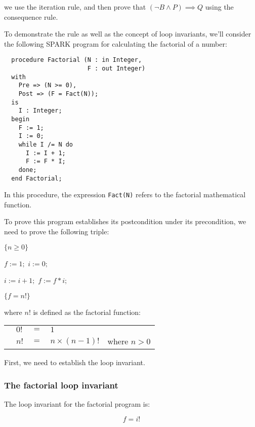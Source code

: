 we use the iteration rule, and then prove that $(\neg B \land P) \implies Q$ using the consequence rule.

\begin{example}
\label{ex:hoare-logic:factorial-proof}

To demonstrate the rule as well as the concept of loop invariants, we'll consider the following SPARK program for calculating the factorial of a number:

\lstset{aboveskip=3mm}
\begin{lstlisting}
  procedure Factorial (N : in Integer, 
                       F : out Integer)
  with
    Pre => (N >= 0),
    Post => (F = Fact(N));
  is
    I : Integer;
  begin
    F := 1;
    I := 0;
    while I /= N do
      I := I + 1;
      F := F * I;
    done;
  end Factorial;
\end{lstlisting}

In this procedure, the expression \texttt{Fact(N)} refers to the factorial mathematical function.

To prove this program establishes its postcondition under its precondition, we need to prove the following triple:

\begin{algorithmic}[0]
\State $\{n \geq 0\}$

\State $f := 1;$
\State $i := 0;$

   \State $i := i + 1;$
   \State $f := f * i;$
\EndWhile

\State $\{f = n!\}$
\end{algorithmic}

where $n!$ is defined as the factorial function:

\begin{tabular}{p{1em}llll}
 &  $0!$ & $=$ & $1$\\
 & $n!$ & $=$ & $n \times (n - 1)!$ & where $n > 0$\\[2mm]
\end{tabular}

First, we need to establish the loop invariant.

\subsubsection*{The factorial loop invariant}

The loop invariant for the factorial program is:

\begin{displaymath}
f = i!
\end{displaymath}


\end{example}
